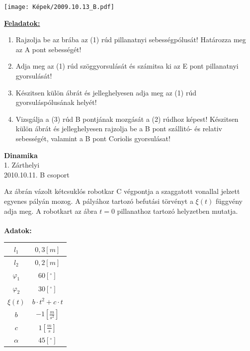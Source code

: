 \documentclass[11pt,a4paper]{article}
\begin{document}
\begin{center}
    \texttt{[image: Képek/2009.10.13\_B.pdf]}
\end{center}

\vspace{2em}
\underline{\textbf{Feladatok:}}
\begin{enumerate}
    \item Rajzolja be az brába az (1) rúd pillanatnyi sebességpólusát! Határozza meg az A pont
    sebességét!
    \item Adja meg az (1) rúd szöggyorsulását és számitsa ki az E pont pillanatnyi gyorsulását!
    \item Készitsen külön ábrát és jelleghelyesen adja meg az (1) rúd gyorsuláspólusának helyét!
    \item Vizsgálja a (3) rúd B pontjának mozgását a (2) rúdhoz képest! Készitsen külön ábrát és
    jelleghelyesen rajzolja be a B pont szállitó- és relativ sebességét, valamint a B pont Coriolis gyorsulásat!
\end{enumerate}
\newpage

\begin{center}
    \textbf{\LARGE{Dinamika}}\\
    1. Zárthelyi\\
    2010.10.11. B csoport
\end{center}
Az ábrán vázolt kétcsuklós robotkar C végpontja a szaggatott vonallal jelzett egyenes pályán mozog. A pályához tartozó befutási törvényt a \(\xi(t)\) függvény adja meg. A robotkart az ábra \(t = 0\) pillanathoz tartozó helyzetben mutatja.\\\\
\textbf{Adatok:}\\
\begin{tabular}{| c | c |}
    \hline
    $l_1 $&$ 0,3 [m]$\\
    \hline
    $l_2 $&$ 0,2 [m]$\\
    \hline
    $\varphi_1 $&$ 60 [^\circ]$\\ 
    \hline
    $\varphi_2 $&$ 30 [^\circ]$\\
    \hline
    $\xi(t) $&$ b \cdot t^2 + c \cdot t$\\
    \hline
    $b $&$ -1 \left[\frac{m}{s^2}\right]$\\
    \hline
    $c $&$ 1 \left[\frac{m}{s}\right]$\\
    \hline
    $\alpha $&$ 45 [^\circ]$\\
    \hline

\end{tabular}
\end{document}
